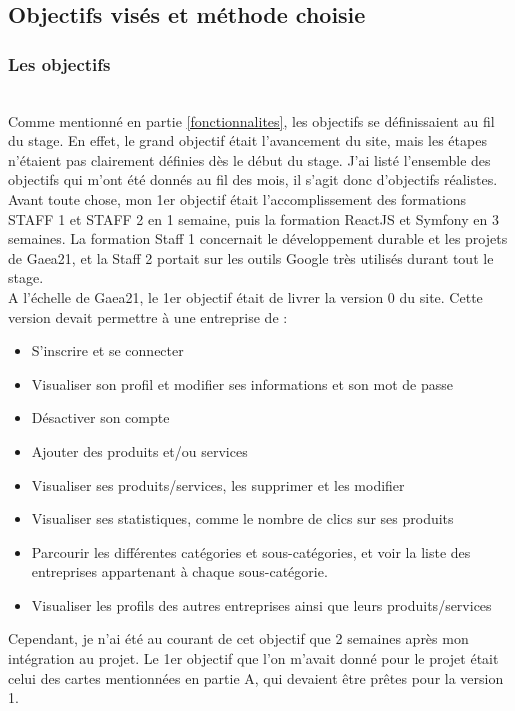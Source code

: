 \pagebreak
\subsection{Objectifs visés et méthode choisie}

\subsubsection{Les objectifs}
~\\
Comme mentionné en partie \ref{fonctionnalites}, les objectifs se définissaient au fil du stage. En effet, le grand objectif était l'avancement du site, mais les étapes n'étaient pas clairement définies dès le début du stage. 
J'ai listé l'ensemble des objectifs qui m'ont été donnés au fil des mois, il s'agit donc d'objectifs réalistes.\\

Avant toute chose, mon 1er objectif était l'accomplissement des formations STAFF 1 et STAFF 2 en 1 semaine, puis la formation ReactJS et Symfony en 3 semaines.
La formation Staff 1 concernait le développement durable et les projets de Gaea21, et la Staff 2 portait sur les outils Google très utilisés durant tout le stage.\\

A l'échelle de Gaea21, le 1er objectif était de livrer la version 0 du site. 
Cette version devait permettre à une entreprise de : 

\begin{itemize}
    \item S'inscrire et se connecter
    \item Visualiser son profil et modifier ses informations et son mot de passe
    \item Désactiver son compte
    \item Ajouter des produits et/ou services
    \item Visualiser ses produits/services, les supprimer et les modifier
    \item Visualiser ses statistiques, comme le nombre de clics sur ses produits
    \item Parcourir les différentes catégories et sous-catégories, et voir la liste des entreprises appartenant à chaque sous-catégorie.
    \item Visualiser les profils des autres entreprises ainsi que leurs produits/services
\end{itemize}

Cependant, je n'ai été au courant de cet objectif que 2 semaines après mon intégration au projet. 
Le 1er objectif que l'on m'avait donné pour le projet était celui des cartes mentionnées en partie A, qui devaient être prêtes pour la version 1. 

